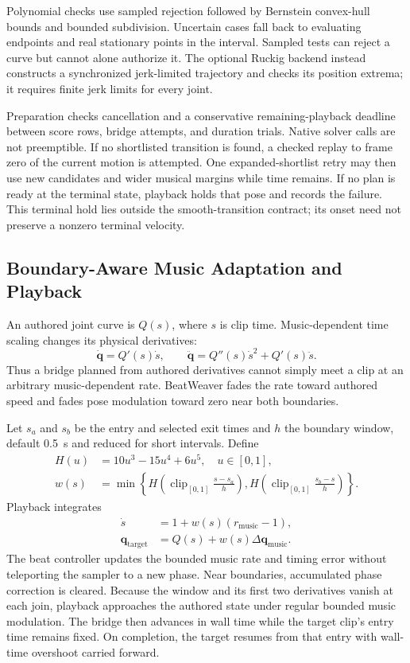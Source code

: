 \documentclass[conference]{IEEEtran}
\newcommand{\vect}[1]{\boldsymbol{#1}}
\begin{document}
Polynomial checks use sampled rejection followed by Bernstein convex-hull
bounds and bounded subdivision. Uncertain cases fall back to evaluating
endpoints and real stationary points in the interval. Sampled tests can reject
a curve but cannot alone authorize it. The optional Ruckig backend instead
constructs a synchronized jerk-limited trajectory and checks its position
extrema; it requires finite jerk limits for every joint.

Preparation checks cancellation and a conservative remaining-playback deadline
between score rows, bridge attempts, and duration trials. Native solver calls
are not preemptible. If no shortlisted transition is found, a checked replay
to frame zero of the current motion is attempted. One expanded-shortlist retry
may then use new candidates and wider musical margins while time remains.
If no plan is ready at the terminal state, playback holds that pose and records
the failure. This terminal hold lies outside the smooth-transition contract;
its onset need not preserve a nonzero terminal velocity.

\subsection{Boundary-Aware Music Adaptation and Playback}
\label{sec:playback}
An authored joint curve is $Q(s)$, where $s$ is clip time. Music-dependent
time scaling changes its physical derivatives:
\begin{equation}
\dot{\vect{q}}=Q'(s)\dot s,\qquad
\ddot{\vect{q}}=Q''(s)\dot s^2+Q'(s)\ddot s.
\label{eq:time-map}
\end{equation}
Thus a bridge planned from authored derivatives cannot simply meet a clip at
an arbitrary music-dependent rate. BeatWeaver fades the rate toward authored
speed and fades pose modulation toward zero near both boundaries.

Let $s_a$ and $s_b$ be the entry and selected exit times and $h$ the boundary
window, default 0.5~s and reduced for short intervals. Define
\begin{align}
H(u)&=10u^3-15u^4+6u^5,\quad u\in[0,1],\\
w(s)&=\min\!\left\{
H\!\left(\operatorname{clip}_{[0,1]}\tfrac{s-s_a}{h}\right),
H\!\left(\operatorname{clip}_{[0,1]}\tfrac{s_b-s}{h}\right)\right\}.
\end{align}
Playback integrates
\begin{equation}
\begin{aligned}
\dot s&=1+w(s)(r_{\mathrm{music}}-1),\\
\vect{q}_{\mathrm{target}}&=Q(s)+w(s)\Delta\vect{q}_{\mathrm{music}}.
\end{aligned}
\label{eq:boundary-playback}
\end{equation}
The beat controller updates the bounded music rate and timing error without
teleporting the sampler to a new phase. Near boundaries, accumulated phase
correction is cleared. Because the window and its first two derivatives
vanish at each join, playback approaches the authored state under regular
bounded music modulation. The bridge then advances in wall time while the
target clip's entry time remains fixed. On completion, the target resumes from
that entry with wall-time overshoot carried forward.
\end{document}
